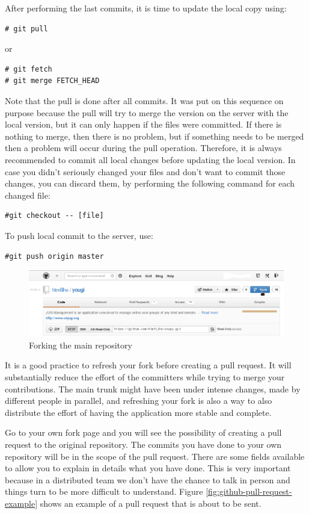\documentclass[envcountsame,envcountchap]{svmono}
\begin{document}
After performing the last commits, it is time to update the local copy using:
\begin{verbatim}
# git pull
\end{verbatim}
or
\begin{verbatim}
# git fetch
# git merge FETCH_HEAD
\end{verbatim}

Note that the pull is done after all commits. It was put on this sequence on purpose because the pull will try to merge the version on the server with the local version, but it can only happen if the files were committed. If there is nothing to merge, then there is no problem, but if something needs to be merged then a problem will occur during the pull operation. Therefore, it is always recommended to commit all local changes before updating the local version. In case you didn't seriously changed your files and don't want to commit those changes, you can discard them, by performing the following command for each changed file:

\begin{verbatim}
#git checkout -- [file]
\end{verbatim}

To push local commit to the server, use:

\begin{verbatim}
#git push origin master
\end{verbatim}

\begin{figure}
\centering
\includegraphics[scale=.34]{figures/github-fork}
\caption{Forking the main repository}
\label{fig:github-fork}
\end{figure}

It is a good practice to refresh your fork before creating a pull request. It will substantially reduce the effort of the committers while trying to merge your contributions. The main trunk might have been under intense changes, made by different people in parallel, and refreshing your fork is also a way to also distribute the effort of having the application more stable and complete.

Go to your own fork page and you will see the possibility of creating a pull request to the original repository. The commits you have done to your own repository will be in the scope of the pull request. There are some fields available to allow you to explain in details what you have done. This is very important because in a distributed team we don't have the chance to talk in person and things turn to be more difficult to understand. Figure \ref{fig:github-pull-request-example} shows an example of a pull request that is about to be sent.
\end{document}
